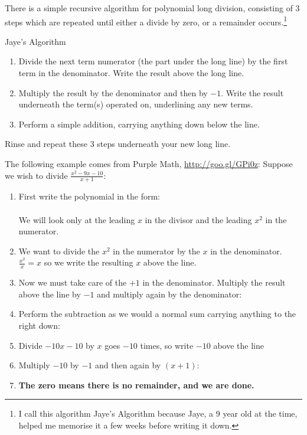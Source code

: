 There is a simple recursive algorithm for polynomial long division, consisting
of 3 steps which are repeated until either a divide by zero, or a remainder
occurs.\footnote{I call this algorithm Jaye's Algorithm because Jaye, a 9 year
old at the time, helped me memorise it a few weeks before writing it down.}

\begin{remember}{Jaye's Algorithm}
\begin{enumerate}
  \item Divide the next term numerator (the part under the long line) by the
  first term in the denominator. Write the result above the long line.
  \item Multiply the result by the denominator and then by $-1$. Write the
  result underneath the term(s) operated on, underlining any new terms.
  \item Perform a simple addition, carrying anything down below the line.
\end{enumerate}
Rinse and repeat these 3 steps underneath your new long line.
\end{remember}

The following example comes from Purple Math, \url{http://goo.gl/GPi0z}:
Suppose we wish to divide $\frac{x^2 -9x -10}{x+1}$:
\begin{enumerate}
  \item First write the polynomial in the form:
  \\  \\[0.5cm]
  We will look only at the leading $x$ in the divisor and the leading $x^2$ in
  the numerator. 
  \item We want to divide the $x^2$ in the numerator by the $x$ in the
  denominator. $\frac{x^2}{x} = x$ so we write the resulting $x$ above the line.
  \\ 
  \item Now we must take care of the $+1$ in the denominator. Multiply the
  result above the line by $-1$ and multiply again by the denominator:
  \\ 
  \item Perform the subtraction as we would a normal sum carrying anything to
  the right down:
  \\ 
  \item Divide $-10x -10$ by $x$ goes $-10$ times, so write $-10$ above the line
  \\  
  \item Multiply $-10$ by $-1$ and then again by $(x+1)$:
  \\ 
  \item \textbf{The zero means there is no remainder, and we are done.}
\end{enumerate}

